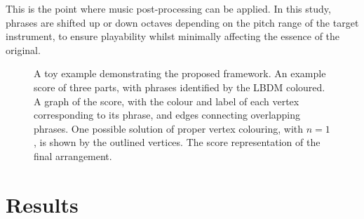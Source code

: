 \documentclass[12pt]{article}
\theoremstyle{definition}
\begin{document}
This is the point where music post-processing can be applied. In this study, phrases are shifted up or down octaves depending on the pitch range of the target instrument, to ensure playability whilst minimally affecting the essence of the original.

\begin{figure}[h]
    \centering\footnotesize
    \begin{subfigure}{.8\textwidth}
        
        \caption{}
        \label{fig:toy-score}
    \end{subfigure}
    \par\bigskip
    \begin{subfigure}{0.5\textwidth}
        
        \caption{}
        \label{fig:toy-graph}
    \end{subfigure}
    \par\bigskip
    \begin{subfigure}{.8\textwidth}
        
        \caption{}
        \label{fig:toy-arrangement}
    \end{subfigure}

    \caption[A toy example demonstrating a simplified version of the proposed framework.]{A toy example demonstrating the proposed framework. \textbf{} An example score of three parts, with phrases identified by the LBDM coloured. \textbf{} A graph of the score, with the colour and label of each vertex corresponding to its phrase, and edges connecting overlapping phrases. One possible solution of proper vertex colouring, with $n=1$, is shown by the outlined vertices. \textbf{} The score representation of the final arrangement.}
    \label{fig:toy}
\end{figure}

\section{Results}
\end{document}
